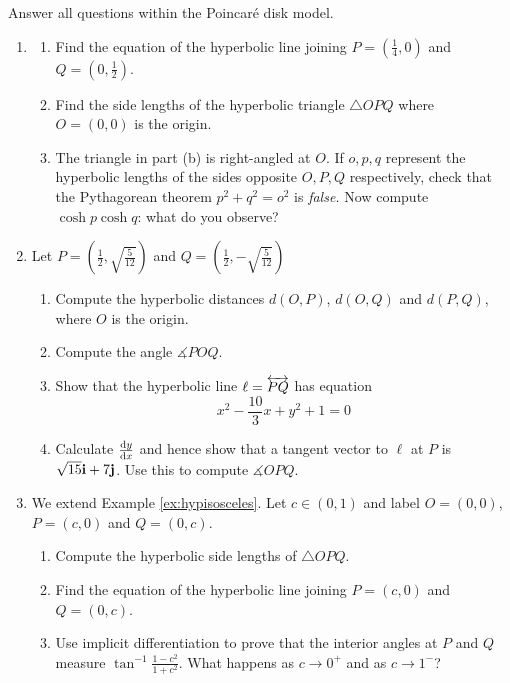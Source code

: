 \begin{exercises}
	Answer all questions within the Poincaré disk model.
	\begin{enumerate}
	  \item\begin{enumerate}
	    \item Find the equation of the hyperbolic line joining $P=(\frac 14,0)$ and $Q=(0,\frac 12)$.
	    \item Find the side lengths of the hyperbolic triangle $\triangle OPQ$ where $O=(0,0)$ is the origin.
	    \item The triangle in part (b) is right-angled at $O$. If $o,p,q$ represent the hyperbolic lengths of the sides opposite $O,P,Q$ respectively, check that the Pythagorean theorem $p^2+q^2=o^2$ is \emph{false.} Now compute $\cosh p\cosh q$: what do you observe?
	  \end{enumerate}
	  	
	  \item Let $P=\left(\frac 12,\sqrt{\frac 5{12}}\right)$ and $Q=\left(\frac 12,-\sqrt{\frac 5{12}}\right)$
	  \begin{enumerate}
	    \item Compute the hyperbolic distances $d(O,P)$, $d(O,Q)$ and $d(P,Q)$, where $O$ is the origin.
	    \item Compute the angle $\measuredangle POQ$.
		  \item Show that the hyperbolic line $\ell=\lin{PQ}$ has equation
			\[
				x^2-\frac{10}3x+y^2+1=0
			\]
	  	\item Calculate $\diff[y]{x}$ and hence show that a tangent vector to $\ell$ at $P$ is $\sqrt{15}\vi+7\vj$. Use this to compute $\measuredangle OPQ$.
		\end{enumerate} 
		
	  \item\label{exs:isorighthypextended} We extend Example \ref{ex:hypisosceles}. Let $c\in(0,1)$ and label $O=(0,0)$, $P=(c,0)$ and $Q=(0,c)$.
	  \begin{enumerate}
	    \item Compute the hyperbolic side lengths of $\triangle OPQ$.
	    \item Find the equation of the hyperbolic line joining $P=(c,0)$ and $Q=(0,c)$.
	    \item Use implicit differentiation to prove that the interior angles at $P$ and $Q$ measure $\tan^{-1}\frac{1-c^2}{1+c^2}$. What happens as $c\to 0^+$ and as $c\to 1^-$?
	  \end{enumerate}
		

\end{enumerate}
\end{exercises}
